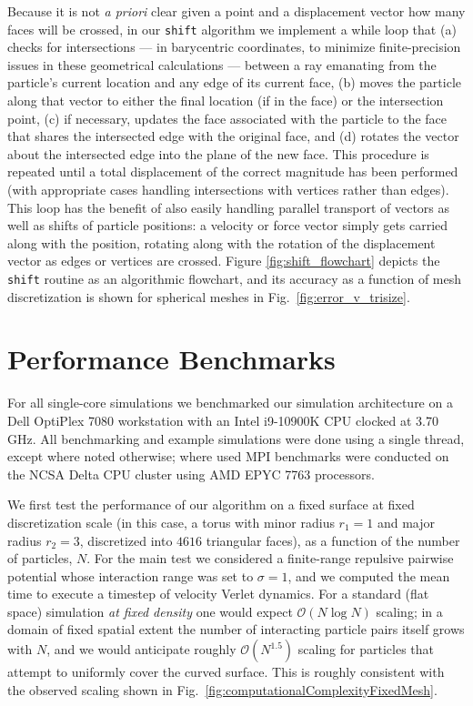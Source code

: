 \documentclass[preprint,12pt]{elsarticle}
\begin{document}
Because it is not \emph{a priori} clear given a point and a displacement vector how many faces will be crossed, in our \verb+shift+ algorithm we implement a while loop that (a) checks for intersections --- in barycentric coordinates, to minimize finite-precision issues in these geometrical calculations --- between a  ray emanating from the  particle's current location and any edge of its current face, (b) moves the particle along that vector to either the final location (if in the face) or the intersection point, (c) if necessary, updates the face associated with the particle to the face that shares the intersected edge with the original face, and (d) rotates the vector about the intersected edge into the plane of the new face. This procedure is repeated until a total displacement of the correct magnitude has been performed (with appropriate cases handling intersections with vertices rather than edges). This loop has the benefit of also easily handling parallel transport of vectors as well as shifts of particle positions: a velocity or force vector simply gets carried along with the position, rotating along with the rotation of the displacement vector  as edges or vertices are crossed. Figure \ref{fig:shift_flowchart} depicts the \verb+shift+ routine as an algorithmic flowchart, and its accuracy as a function of mesh discretization is shown for spherical meshes in Fig.~\ref{fig:error_v_trisize}.


\section{Performance Benchmarks}\label{sec:benchmarks}

For all single-core simulations we benchmarked our simulation architecture on a Dell OptiPlex 7080 workstation with an Intel
i9-10900K CPU clocked at 3.70 GHz. All benchmarking and example simulations were done using a single thread, except where noted otherwise; where used MPI benchmarks were conducted on the NCSA Delta CPU cluster using AMD EPYC 7763 processors. 


We first test the performance of our algorithm on a fixed surface at fixed discretization scale (in this case, a torus with minor radius $r_1=1$ and major radius $r_2=3$, discretized into $4616$ triangular faces), as a function of the number of particles, $N$. For the main test we considered a finite-range repulsive pairwise potential whose interaction range was set to $\sigma=1$, and we computed the mean time to execute a timestep of velocity Verlet dynamics. For a standard (flat space) simulation \emph{at fixed density} one would expect $\mathcal{O}(N \log N)$ scaling; in a domain of fixed spatial extent the number of interacting particle pairs itself grows with $N$, and we would anticipate  roughly $\mathcal{O}(N^{1.5})$ scaling for particles that attempt to uniformly cover the curved surface. This is roughly consistent with the observed scaling shown in Fig.~\ref{fig:computationalComplexityFixedMesh}.
\end{document}
